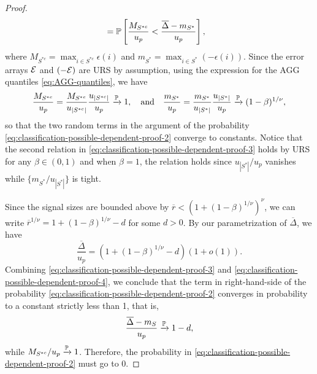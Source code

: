 \begin{proof}
\begin{align}
  &= \P\left[ \frac{M_{S^{*c}}}{u_p} < \frac{\overline{\Delta} - m_{S^*}}{u_p} \right], \label{eq:classification-possible-dependent-proof-2}
\end{align}
where $M_{S^{*c}} = \max_{i\in S^{*c}}\epsilon(i)$ and $m_{S^*} = \max_{i\in S^*}\left(-\epsilon(i)\right)$.
Since the error arrays ${\cal E}$ and $(-{\cal E})$ are URS by assumption, using the expression for the AGG quantiles \eqref{eq:AGG-quantiles}, we have
\begin{equation} \label{eq:classification-possible-dependent-proof-3}
    \frac{M_{S^{*c}}}{u_p} = \frac{M_{S^{*c}}}{u_{|S^{*c}|}} \frac{u_{|S^{*c}|}}{u_p} \xrightarrow{\P} 1,
\quad \text{and} \quad
\frac{m_{S^*}}{u_p} = \frac{m_{S^*}}{u_{|S^*|}} \frac{u_{|S^*|}}{u_p} \xrightarrow{\P} (1-\beta)^{1/\nu},
\end{equation}
so that the two random terms in the argument of the probability \eqref{eq:classification-possible-dependent-proof-2} converge to constants.
Notice that the second relation in \eqref{eq:classification-possible-dependent-proof-3} holds by URS for any 
$\beta\in(0,1)$ and when $\beta=1$, the relation holds since ${u_{|S^*|}}/{u_p}$ vanishes while 
$\{{m_{S^*}}/{u_{|S^*|}}\}$ is tight.

Since the signal sizes are bounded above by $\overline{r} < \left(1 + (1-\beta)^{1/\nu}\right)^{\nu}$, we can write $\overline{r}^{1/\nu} = 1 + (1-\beta)^{1/\nu} - d$ for some $d > 0$. By our parametrization of $\overline{\Delta}$, we have
\begin{equation} \label{eq:classification-possible-dependent-proof-4}
    \frac{\overline{\Delta}}{u_p} = \left(1+(1-\beta)^{1/\nu}-d\right)(1+o(1)).
\end{equation}
Combining \eqref{eq:classification-possible-dependent-proof-3} and \eqref{eq:classification-possible-dependent-proof-4}, we conclude that the term in right-hand-side of the probability \eqref{eq:classification-possible-dependent-proof-2} converges in probability to a constant strictly less than 1, that is, 
\begin{equation}
    \frac{\overline{\Delta} - m_S}{u_p} \xrightarrow{\P} 1 - d,
\end{equation}
while ${M_{S^{*c}}}/{u_p} \xrightarrow{\P} 1$.
Therefore, the probability in \eqref{eq:classification-possible-dependent-proof-2} must go to 0.
\end{proof}

